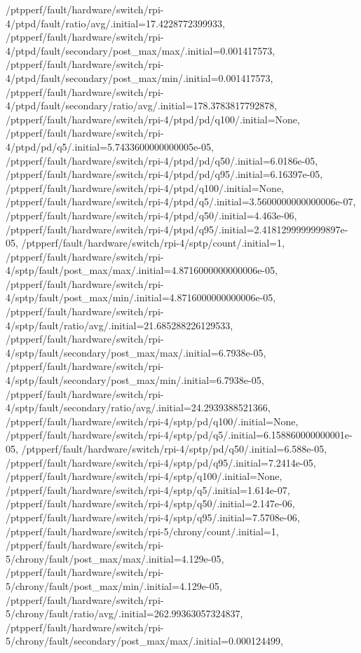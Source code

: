 {    /ptpperf/fault/hardware/switch/rpi-4/ptpd/fault/ratio/avg/.initial=17.4228772399933,
    /ptpperf/fault/hardware/switch/rpi-4/ptpd/fault/secondary/post_max/max/.initial=0.001417573,
    /ptpperf/fault/hardware/switch/rpi-4/ptpd/fault/secondary/post_max/min/.initial=0.001417573,
    /ptpperf/fault/hardware/switch/rpi-4/ptpd/fault/secondary/ratio/avg/.initial=178.3783817792878,
    /ptpperf/fault/hardware/switch/rpi-4/ptpd/pd/q100/.initial=None,
    /ptpperf/fault/hardware/switch/rpi-4/ptpd/pd/q5/.initial=5.7433600000000005e-05,
    /ptpperf/fault/hardware/switch/rpi-4/ptpd/pd/q50/.initial=6.0186e-05,
    /ptpperf/fault/hardware/switch/rpi-4/ptpd/pd/q95/.initial=6.16397e-05,
    /ptpperf/fault/hardware/switch/rpi-4/ptpd/q100/.initial=None,
    /ptpperf/fault/hardware/switch/rpi-4/ptpd/q5/.initial=3.5600000000000006e-07,
    /ptpperf/fault/hardware/switch/rpi-4/ptpd/q50/.initial=4.463e-06,
    /ptpperf/fault/hardware/switch/rpi-4/ptpd/q95/.initial=2.4181299999999897e-05,
    /ptpperf/fault/hardware/switch/rpi-4/sptp/count/.initial=1,
    /ptpperf/fault/hardware/switch/rpi-4/sptp/fault/post_max/max/.initial=4.8716000000000006e-05,
    /ptpperf/fault/hardware/switch/rpi-4/sptp/fault/post_max/min/.initial=4.8716000000000006e-05,
    /ptpperf/fault/hardware/switch/rpi-4/sptp/fault/ratio/avg/.initial=21.685288226129533,
    /ptpperf/fault/hardware/switch/rpi-4/sptp/fault/secondary/post_max/max/.initial=6.7938e-05,
    /ptpperf/fault/hardware/switch/rpi-4/sptp/fault/secondary/post_max/min/.initial=6.7938e-05,
    /ptpperf/fault/hardware/switch/rpi-4/sptp/fault/secondary/ratio/avg/.initial=24.2939388521366,
    /ptpperf/fault/hardware/switch/rpi-4/sptp/pd/q100/.initial=None,
    /ptpperf/fault/hardware/switch/rpi-4/sptp/pd/q5/.initial=6.158860000000001e-05,
    /ptpperf/fault/hardware/switch/rpi-4/sptp/pd/q50/.initial=6.588e-05,
    /ptpperf/fault/hardware/switch/rpi-4/sptp/pd/q95/.initial=7.2414e-05,
    /ptpperf/fault/hardware/switch/rpi-4/sptp/q100/.initial=None,
    /ptpperf/fault/hardware/switch/rpi-4/sptp/q5/.initial=1.614e-07,
    /ptpperf/fault/hardware/switch/rpi-4/sptp/q50/.initial=2.147e-06,
    /ptpperf/fault/hardware/switch/rpi-4/sptp/q95/.initial=7.5708e-06,
    /ptpperf/fault/hardware/switch/rpi-5/chrony/count/.initial=1,
    /ptpperf/fault/hardware/switch/rpi-5/chrony/fault/post_max/max/.initial=4.129e-05,
    /ptpperf/fault/hardware/switch/rpi-5/chrony/fault/post_max/min/.initial=4.129e-05,
    /ptpperf/fault/hardware/switch/rpi-5/chrony/fault/ratio/avg/.initial=262.99363057324837,
    /ptpperf/fault/hardware/switch/rpi-5/chrony/fault/secondary/post_max/max/.initial=0.000124499,
}
